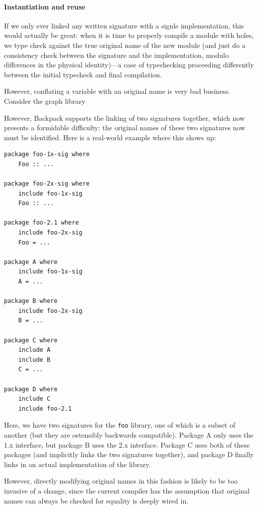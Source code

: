 \documentclass{article}
\begin{document}

\paragraph{Instantiation and reuse}

If we only ever linked any written signature with a signle implementation, this would actually
be great: when it is time to properly compile a module with holes, we
type check against the true original name of the new module (and just
do a consistency check between the signature and the implementation, modulo
differences in the physical identity)---a case of typechecking proceeding
differently between the initial typecheck and final compilation.

However, conflating a variable with an original name is very bad business.
Consider the graph library 

However, Backpack supports the linking of two signatures together, which
now presents a formidable difficulty: the original names of these two
signatures now must be identified.  Here is a real-world example where
this shows up:

\begin{verbatim}
package foo-1x-sig where
    Foo :: ...

package foo-2x-sig where
    include foo-1x-sig
    Foo :: ...

package foo-2.1 where
    include foo-2x-sig
    Foo = ...

package A where
    include foo-1x-sig
    A = ...

package B where
    include foo-2x-sig
    B = ...

package C where
    include A
    include B
    C = ...

package D where
    include C
    include foo-2.1
\end{verbatim}

Here, we have two signatures for the \verb|foo| library, one of which
is a subset of another (but they are ostensibly backwards compatible).
Package A only uses the 1.x interface, but package B uses the 2.x interface.
Package C uses both of these packages (and implicitly links the two signatures
together), and package D finally links in an actual implementation of the
library.



However, directly modifying original names in this fashion
is likely to be too invasive of a change, since the current compiler has
the assumption that original names can always be checked for equality
is deeply wired in.
\end{document}

